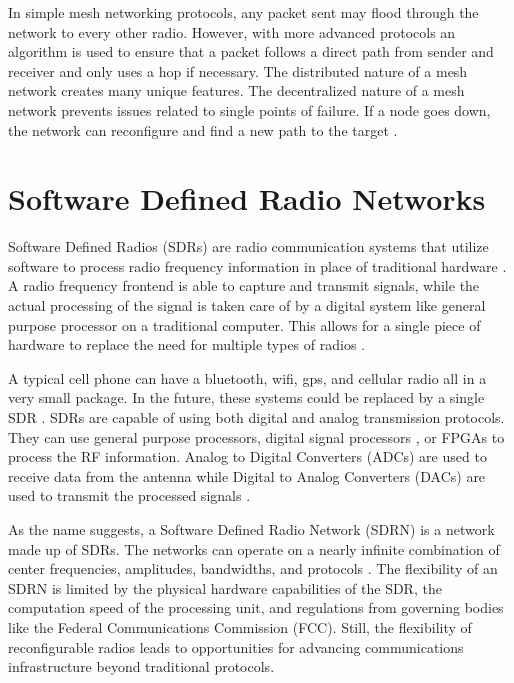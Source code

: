 In simple mesh networking protocols, any packet sent may flood through the network to every other radio. However, with more advanced protocols an algorithm is used to ensure that a packet follows a direct path from sender and receiver and only uses a hop if necessary. The distributed nature of a mesh network creates many unique features. The decentralized nature of a mesh network prevents issues related to single points of failure. If a node goes down, the network can reconfigure and find a new path to the target \cite{0033}. 


\section{Software Defined Radio Networks}

Software Defined Radios (SDRs) are radio communication systems that utilize software to process radio frequency information in place of traditional hardware \cite{761033}. A radio frequency frontend is able to capture and transmit signals, while the actual processing of the signal is taken care of by a digital system like general purpose processor on a traditional computer. This allows for a single piece of hardware to replace the need for multiple types of radios \cite{393001}.

A typical cell phone can have a bluetooth, wifi, gps, and cellular radio all in a very small package. In the future, these systems could be replaced by a single SDR \cite{393001}. SDRs are capable of using both digital and analog transmission protocols. They can use general purpose processors, digital signal processors \cite{393001}, or FPGAs \cite{5747366} to process the RF information. Analog to Digital Converters (ADCs) are used to receive data from the antenna while Digital to Analog Converters (DACs) are used to transmit the processed signals . 

As the name suggests, a Software Defined Radio Network (SDRN) is a network made up of SDRs. The networks can operate on a nearly infinite combination of center frequencies, amplitudes, bandwidths, and protocols \cite{7039225}. The flexibility of an SDRN is limited by the physical hardware capabilities of the SDR, the computation speed of the processing unit, and regulations from governing bodies like the Federal Communications Commission (FCC). Still, the flexibility of reconfigurable radios leads to opportunities for advancing communications infrastructure beyond traditional protocols. 

